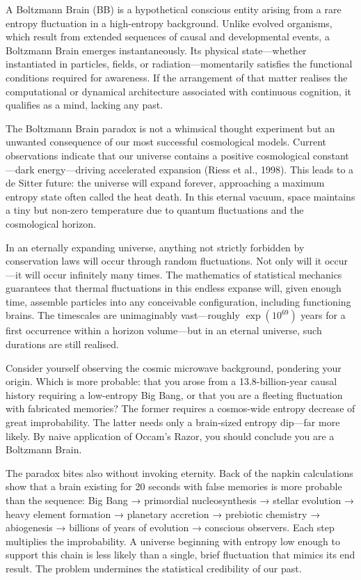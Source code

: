 A Boltzmann Brain (BB) is a hypothetical conscious entity arising from a rare entropy fluctuation in a high-entropy background. Unlike evolved organisms, which result from extended sequences of causal and developmental events, a Boltzmann Brain emerges instantaneously. Its physical state—whether instantiated in particles, fields, or radiation—momentarily satisfies the functional conditions required for awareness. If the arrangement of that matter realises the computational or dynamical architecture associated with continuous cognition, it qualifies as a mind, lacking any past.

The Boltzmann Brain paradox is not a whimsical thought experiment but an unwanted consequence of our most successful cosmological models. Current observations indicate that our universe contains a positive cosmological constant—dark energy—driving accelerated expansion (Riess et al., 1998). This leads to a de Sitter future: the universe will expand forever, approaching a maximum entropy state often called the \QSOpen{}heat death.\QSClose{} In this eternal vacuum, space maintains a tiny but non-zero temperature due to quantum fluctuations and the cosmological horizon.

In an eternally expanding universe, anything not strictly forbidden by conservation laws will occur through random fluctuations. Not only will it occur—it will occur infinitely many times. The mathematics of statistical mechanics guarantees that thermal fluctuations in this endless expanse will, given enough time, assemble particles into any conceivable configuration, including functioning brains. The timescales are unimaginably vast—roughly $\exp(10^{69})$ years for a first occurrence within a horizon volume—but in an eternal universe, such durations are still realised.

Consider yourself observing the cosmic microwave background, pondering your origin. Which is more probable: that you arose from a 13.8-billion-year causal history requiring a low-entropy Big Bang, or that you are a fleeting fluctuation with fabricated memories? The former requires a cosmos-wide entropy decrease of great improbability. The latter needs only a brain-sized entropy dip—far more likely. By naive application of Occam's Razor, you should conclude you are a Boltzmann Brain.

The paradox bites also without invoking eternity. Back of the napkin calculations show that a brain existing for 20 seconds with false memories is more probable than the sequence: Big Bang → primordial nucleosynthesis → stellar evolution → heavy element formation → planetary accretion → prebiotic chemistry → abiogenesis → billions of years of evolution → conscious observers. Each step multiplies the improbability. A universe beginning with entropy low enough to support this chain is less likely than a single, brief fluctuation that mimics its end result. The problem undermines the statistical credibility of our past.

